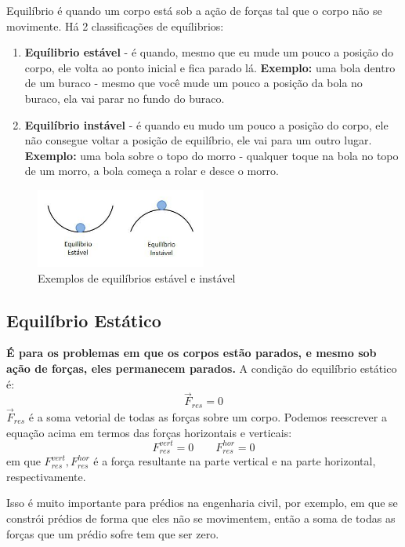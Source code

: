 \documentclass[12pt]{extarticle}
\newcommand{\<}{\langle}
\renewcommand{\>}{\rangle}
\theoremstyle{definition}
\begin{document}
Equilíbrio é quando um corpo está sob a ação de forças tal que o corpo não se movimente. Há 2 classificações de equílibrios:
\begin{enumerate}
    \item \textbf{Equílibrio estável} - é quando, mesmo que eu mude um pouco a posição do corpo, ele volta ao ponto inicial e fica parado lá. \textbf{Exemplo:} uma bola dentro de um buraco - mesmo que você mude um pouco a posição da bola no buraco, ela vai parar no fundo do buraco.
    
    \item \textbf{Equilíbrio instável} - é quando eu mudo um pouco a posição do corpo, ele não consegue voltar a posição de equilíbrio, ele vai para um outro lugar. \textbf{Exemplo:} uma bola sobre o topo do morro - qualquer toque na bola no topo de um morro, a bola começa a rolar e desce o morro.
\end{enumerate}
\begin{figure}[h]
    \centering
    \includegraphics[width=0.5\textwidth]{equilibrios.jpg}
    \caption{Exemplos de equilíbrios estável e instável}
    \label{fig:equilibrium}
\end{figure}

\subsection{Equilíbrio Estático}
\textbf{É para os problemas em que os corpos estão parados, e mesmo sob ação de forças, eles permanecem parados.} A condição do equilíbrio estático é:
\begin{equation}
    \vec{F}_{res} =0
\end{equation}
\noindent $\vec{F}_{res}$ é a soma vetorial de todas as forças sobre um corpo. Podemos reescrever a equação acima em termos das forças horizontais e verticais:
\begin{equation}
    F_{res}^{vert} = 0 \quad \quad F_{res}^{hor} = 0
\end{equation}
\noindent em que $F_{res}^{vert},F_{res}^{hor}$ é a força resultante na parte vertical e na parte horizontal, respectivamente.

Isso é muito importante para prédios na engenharia civil, por exemplo, em que se constrói prédios de forma que eles não se movimentem, então a soma de todas as forças que um prédio sofre tem que ser zero.
\end{document}
